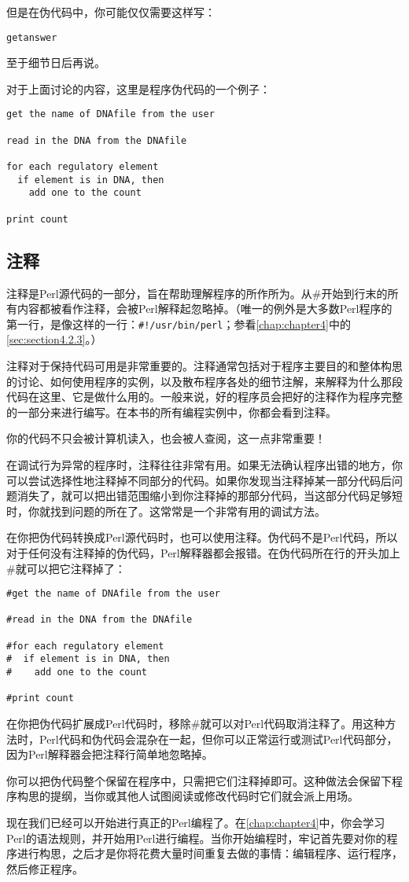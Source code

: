 但是在伪代码中，你可能仅仅需要这样写：

\begin{lstlisting}
getanswer
\end{lstlisting}

至于细节日后再说。

对于上面讨论的内容，这里是程序伪代码的一个例子：

\begin{lstlisting}
get the name of DNAfile from the user

read in the DNA from the DNAfile

for each regulatory element
  if element is in DNA, then
    add one to the count

print count
\end{lstlisting}

\subsection{注释}
注释是Perl源代码的一部分，旨在帮助理解程序的所作所为。从\#开始到行末的所有内容都被看作注释，会被Perl解释起忽略掉。（唯一的例外是大多数Perl程序的第一行，是像这样的一行：\verb|#!/usr/bin/perl|；参看\ref{chap:chapter4}中的\ref{sec:section4.2.3}。）

注释对于保持代码可用是非常重要的。注释通常包括对于程序主要目的和整体构思的讨论、如何使用程序的实例，以及散布程序各处的细节注解，来解释为什么那段代码在这里、它是做什么用的。一般来说，好的程序员会把好的注释作为程序完整的一部分来进行编写。在本书的所有编程实例中，你都会看到注释。

你的代码不只会被计算机读入，也会被人查阅，这一点非常重要！

在调试行为异常的程序时，注释往往非常有用。如果无法确认程序出错的地方，你可以尝试选择性地注释掉不同部分的代码。如果你发现当注释掉某一部分代码后问题消失了，就可以把出错范围缩小到你注释掉的那部分代码，当这部分代码足够短时，你就找到问题的所在了。这常常是一个非常有用的调试方法。

在你把伪代码转换成Perl源代码时，也可以使用注释。伪代码不是Perl代码，所以对于任何没有注释掉的伪代码，Perl解释器都会报错。在伪代码所在行的开头加上\#就可以把它注释掉了：

\begin{lstlisting}
#get the name of DNAfile from the user

#read in the DNA from the DNAfile

#for each regulatory element
#  if element is in DNA, then
#    add one to the count

#print count
\end{lstlisting}

在你把伪代码扩展成Perl代码时，移除\#就可以对Perl代码取消注释了。用这种方法时，Perl代码和伪代码会混杂在一起，但你可以正常运行或测试Perl代码部分，因为Perl解释器会把注释行简单地忽略掉。

你可以把伪代码整个保留在程序中，只需把它们注释掉即可。这种做法会保留下程序构思的提纲，当你或其他人试图阅读或修改代码时它们就会派上用场。

现在我们已经可以开始进行真正的Perl编程了。在\ref{chap:chapter4}中，你会学习Perl的语法规则，并开始用Perl进行编程。当你开始编程时，牢记首先要对你的程序进行构思，之后才是你将花费大量时间重复去做的事情：编辑程序、运行程序，然后修正程序。
